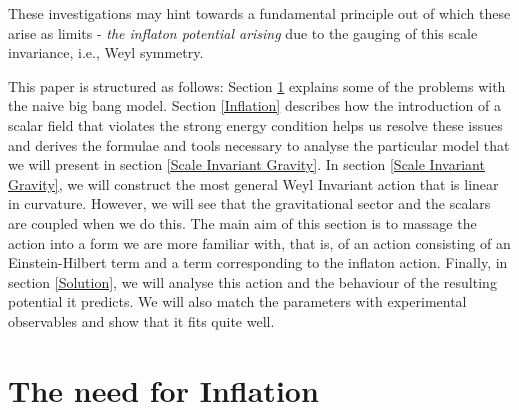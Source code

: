 \documentclass[aps,prd,reprint,preprintnumbers,showpacs,floatfix,nofootinbib,superscript address]{revtex4-2}
\begin{document}
These investigations may hint towards a fundamental principle out of which these arise as limits - \textit{the inflaton potential arising} due to the gauging of this scale invariance, i.e., Weyl symmetry.

This paper is structured as follows: Section \ref{The need for Inflation} explains some of the problems with the naive big bang model. Section \ref{Inflation} describes how the introduction of a scalar field that violates the strong energy condition helps us resolve these issues and derives the formulae and tools necessary to analyse the particular model that we will present in section \ref{Scale Invariant Gravity}. In section \ref{Scale Invariant Gravity}, we will construct the most general Weyl Invariant action that is linear in curvature. However, we will see that the gravitational sector and the scalars are coupled when we do this. The main aim of this section is to massage the action into a form we are more familiar with, that is, of an action consisting of an Einstein-Hilbert term and a term corresponding to the inflaton action. Finally, in section \ref{Solution}, we will analyse this action and the behaviour of the resulting potential it predicts. We will also match the parameters with experimental observables and show that it fits quite well. 


\section{The need for Inflation}\label{The need for Inflation}
\end{document}
